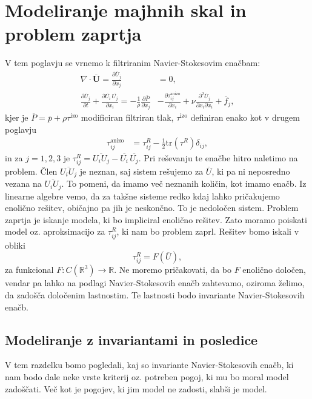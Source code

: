 \documentclass[mat2, tisk]{fmfdelo}
\newcommand{\R}{\mathbb R}
\newcommand{\bd}{\textbf}
\begin{document}
\section{Modeliranje majhnih skal in problem zaprtja}
V tem poglavju se vrnemo k filtriranim Navier-Stokesovim enačbam: 
\begin{align*}
  \nabla\cdot\overline{\bd{U}} = \frac{\partial \overline{U}_j}{\partial x_j} &= 0,\\[2mm]
  \frac{\partial \overline{U}_j}{\partial t} + \frac{\partial \overline{U_i}\, \overline{U_j}}{\partial x_i} = -\frac{1}{\rho} \frac{\partial \overline{P}}{\partial x_j}& 
  - \frac{\partial \tau_{ij}^\text{anizo}}{\partial x_i}+ \nu \frac{\partial^2 \overline{U}_j}{\partial x_i \partial x_i} + \overline{f}_j,
\end{align*}
kjer je $\overline{P} = \overline{p} + \rho\tau^\text{izo}$ modificiran filtriran tlak, $\tau^{\text{izo}}$
definiran enako kot v drugem poglavju
\begin{align}
  \tau_{ij}^\text{anizo} &= \tau_{ij}^R - \frac{1}{2}\text{tr}(\tau^R)\delta_{ij},
\label{anizo_def}
\end{align}
in za $j=1, 2, 3$ je $\tau_{ij}^R = \overline{U_i U_j} - \overline{U_i} \,\overline{U_j}$. 
Pri reševanju te enačbe hitro naletimo na problem. Člen $\overline{U_i U_j}$ 
je neznan, saj sistem rešujemo za $\overline{U}$, ki pa ni neposredno vezana na $\overline{U_i U_j}$. 
To pomeni, da imamo več neznanih količin, kot imamo enačb. Iz linearne algebre 
vemo, da za takšne sisteme redko kdaj lahko pričakujemo enolično rešitev, 
običajno pa jih je neskončno. To je nedoločen sistem. Problem zaprtja je iskanje modela, ki bo impliciral enolično rešitev.
Zato moramo poiskati model oz. aproksimacijo za $\tau_{ij}^R$, ki nam bo problem 
zaprl. Rešitev bomo iskali v obliki 
\begin{equation*}
\tau_{ij}^R = F(\overline{U}), 
\end{equation*}
za funkcional $F: C(\R^3) \rightarrow \R$. Ne moremo pričakovati, da 
bo $F$ enolično določen, vendar pa lahko na podlagi Navier-Stokesovih enačb zahtevamo, oziroma želimo,
da zadošča določenim lastnostim. Te lastnosti bodo invariante Navier-Stokesovih enačb.

\subsection{Modeliranje z invariantami in posledice}

V tem razdelku bomo pogledali, kaj so invariante Navier-Stokesovih 
enačb, ki nam bodo dale neke vrste kriterij oz. potreben pogoj, ki 
mu bo moral model zadoščati. Več kot je pogojev, ki jim model 
ne zadosti, slabši je model.
\end{document}
